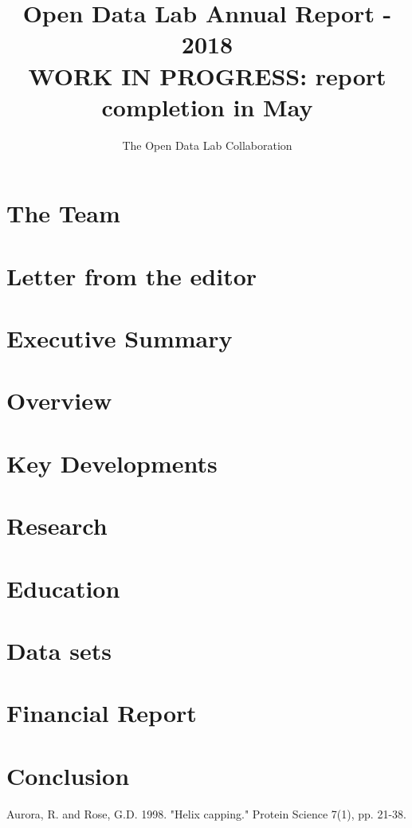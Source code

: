 \documentclass[12pt,letterpaper]{report} %
\title{Open Data Lab Annual Report - 2018\\
\large WORK IN PROGRESS: report completion in May }
\author{The Open Data Lab Collaboration}
\begin{document}
\maketitle
\chapter*{The Team}   %
\chapter*{Letter from the editor}   %
\chapter{Executive Summary}
\tableofcontents
\chapter{Overview} 
\chapter{Key Developments} 
\chapter{Research} 
\chapter{Education} 
\chapter{Data sets} 	
\chapter{Financial Report} 
\chapter{Conclusion}
\begin{thebibliography}{99}
 Aurora, R. and Rose, G.D. 1998. "Helix capping." Protein Science 7(1), pp. 21-38.
\end{thebibliography}
\end{document}
